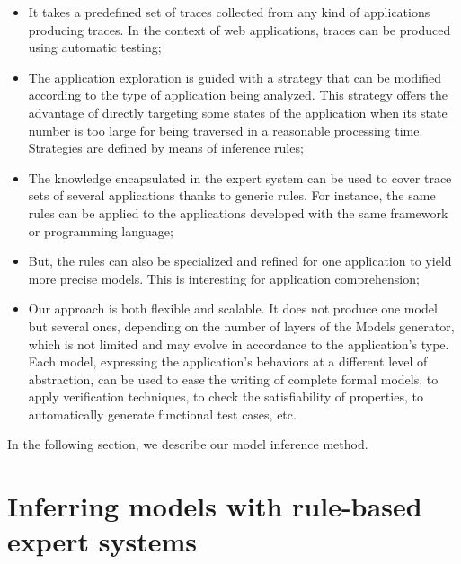 \begin{itemize}
\item It takes a predefined set of traces collected from any kind
of applications producing traces. In the context of web
applications, traces can be produced using automatic testing;

\item The application exploration is guided with a strategy that
can be modified according to the type of application being
analyzed. This strategy offers the advantage of directly targeting
some states of the application when its state number is too large
for being traversed in a reasonable processing time. Strategies
are defined by means of inference rules;

\item The knowledge encapsulated in the expert system can be used
to cover trace sets of several applications thanks to generic
rules. For instance, the same rules can be applied to the
applications developed with the same framework or programming
language;

\item But, the rules can also be specialized and refined for one
application to yield more precise models. This is interesting for
application comprehension;

\item Our approach is both flexible and scalable. It does not
produce one model but several ones, depending on the number of
layers of the Models generator, which is not limited and may
evolve in accordance to the application's type. Each model,
expressing the application's behaviors at a different level of
abstraction, can be used to ease the writing of complete formal
models, to apply verification techniques, to check the
satisfiability of properties, to automatically generate
functional test cases, etc.
\end{itemize}

In the following section, we describe our model inference method.


\section{Inferring models with rule-based expert systems}
\label{sec:modelinf:webapps:contrib}

